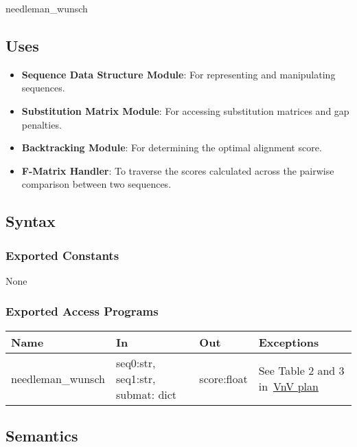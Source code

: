 \documentclass[12pt, titlepage]{article}
\begin{document}
needleman\_wunsch

\subsection{Uses}

\begin{itemize}
    \item \textbf{Sequence Data Structure Module}: For representing and manipulating sequences.
    \item \textbf{Substitution Matrix Module}: For accessing substitution matrices and gap penalties.
    \item \textbf{Backtracking Module}: For determining the optimal alignment score.
    \item \textbf{F-Matrix Handler}: To traverse the scores calculated across the pairwise comparison between two sequences.
  \end{itemize}
  
\subsection{Syntax}

\subsubsection{Exported Constants}

None

\subsubsection{Exported Access Programs}

\begin{center}
\begin{tabular}{p{4cm} p{4cm} p{3cm} p{2cm}}
\hline
\textbf{Name} & \textbf{In} & \textbf{Out} & \textbf{Exceptions} \\
\hline
needleman\_wunsch & seq0:str, seq1:str, submat: dict & score:float & See Table 2 and 3 in~\href{https://github.com/UGarCil/UGarcil_capstone/blob/main/docs/VnVPlan/VnVPlan.pdf}{VnV plan}\\
\hline
\end{tabular}
\end{center}

\subsection{Semantics}
\end{document}
